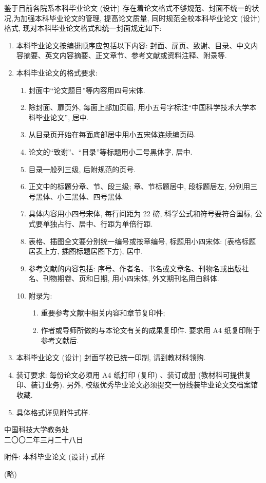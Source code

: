 鉴于目前各院系本科毕业论文 (设计) 存在着论文格式不够规范、封面不统一的状况,为加强本科毕业论文的管理, 提高论文质量, 同时规范全校本科毕业论文 (设计) 格式, 现对本科毕业论文格式和统一封面规定如下:
\begin{enumerate}
  \item 本科毕业论文按编排顺序应包括以下内容: 封面、扉页、致谢、目录、中文内容摘要、英文内容摘要、正文章节、参考文献或资料注释、附录等.
  \item 本科毕业论文的格式要求:
    \begin{enumerate}
      \item 封面中“论文题目”等内容用四号宋体.
      \item 除封面、扉页外, 每面上部加页眉, 用小五号字标注“中国科学技术大学本科毕业论文”, 居中.
      \item 从目录页开始在每面底部居中用小五宋体连续编页码.
      \item 论文的“致谢”、“目录”等标题用小二号黑体字, 居中.
      \item 目录一般列三级, 后附规范的页号.
      \item 正文中的标题分章、节、段三级; 章、节标题居中, 段标题居左, 分别用三号黑体、小三黑体、四号黑体.
      \item 具体内容用小四号宋体, 每行间距为 22 磅, 科学公式和符号要符合国标, 公式要单独占行、居中、行距为单倍行距.
      \item 表格、插图全文要分别统一编号或按章编号, 标题用小四宋体: (表格标题居表上方, 插图标题居图下方), 居中.
      \item 参考文献的内容包括: 序号、作者名、书名或文章名、刊物名或出版社名、刊物期卷、页和日期, 用小四宋体, 外文期刊名用白斜体.
      \item 附录为:
        \begin{enumerate}
          \item 重要参考文献中相关内容和章节复印件;
          \item 作者或导师所做的与本论文有关的成果复印件. 要求用 A4 纸复印附于参考文献后.
        \end{enumerate}
    \end{enumerate}
  \item 本科毕业论文 (设计) 封面学校已统一印制, 请到教材科领购.
  \item 装订要求: 每份论文必须用 A4 纸打印 (复印) 、装订成册 (教材科可提供复印、装订业务). 另外, 校级优秀毕业论文必须提交一份线装毕业论文交档案馆收藏.
  \item 具体格式详见附件式样.
\end{enumerate}

\begin{flushright}
中国科技大学教务处\\
二〇〇二年三月二十八日
\end{flushright}

附件: 本科毕业论文 (设计) 式样

(略)
